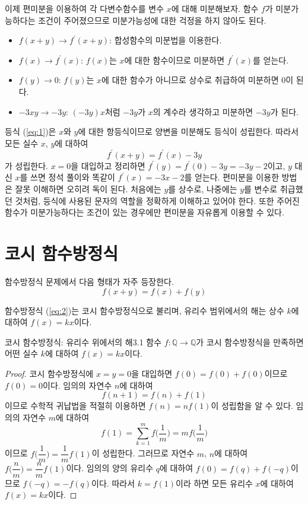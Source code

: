 \documentclass{article}
\begin{document}
이제 편미분을 이용하여 각 다변수함수를 변수 $x$에 대해 미분해보자. 함수 $f$가 미분가능하다는 조건이 주어졌으므로 미분가능성에 대한 걱정을 하지 않아도 된다.

\begin{itemize}
	\item $f(x+y)\to f^\prime(x+y)$: 합성함수의 미분법을 이용한다.
	\item $f(x)\to f^\prime(x)$: $f(x)$는 $x$에 대한 함수이므로 미분하면 $f^\prime(x)$를 얻는다.
	\item $f(y)\to 0$: $f(y)$는 $x$에 대한 함수가 아니므로 상수로 취급하여 미분하면 $0$이 된다.
	\item $-3xy\to -3y$: $(-3y)x$처럼 $-3y$가 $x$의 계수라 생각하고 미분하면 $-3y$가 된다.
\end{itemize}

등식 (\ref{eq:1})은 $x$와 $y$에 대한 항등식이므로 양변을 미분해도 등식이 성립한다. 따라서 모든 실수 $x$, $y$에 대하여
\[
	f^\prime(x+y)=f^\prime(x)-3y
\]
가 성립한다. $x=0$을 대입하고 정리하면 $f^\prime(y)=f^\prime(0)-3y=-3y-2$이고, $y$ 대신 $x$를 쓰면 정석 풀이와 똑같이 $f^\prime(x)=-3x-2$를 얻는다. 편미분을 이용한 방법은 잘못 이해하면 오히려 독이 된다. 처음에는 $y$를 상수로, 나중에는 $y$를 변수로 취급했던 것처럼, 등식에 사용된 문자의 역할을 정확하게 이해하고 있어야 한다. 또한 주어진 함수가 미분가능하다는 조건이 있는 경우에만 편미분을 자유롭게 이용할 수 있다.

\section{코시 함수방정식}
함수방정식 문제에서 다음 형태가 자주 등장한다.
\begin{equation}
	\label{eq:2}
	f(x+y)=f(x)+f(y)
\end{equation}

함수방정식 (\ref{eq:2})는 코시 함수방정식으로 불리며, 유리수 범위에서의 해는 상수 $k$에 대하여 $f(x)=kx$이다.

\begin{thm}{코시 함수방정식: 유리수 위에서의 해}{3.1}
	함수 $f:\mathbb Q\to\mathbb Q$가 코시 함수방정식을 만족하면 어떤 실수 $k$에 대하여 $f(x)=kx$이다.
\end{thm}

\begin{proof}
	코시 함수방정식에 $x=y=0$을 대입하면 $f(0)=f(0)+f(0)$이므로 $f(0)=0$이다. 임의의 자연수 $n$에 대하여
	\[
		f(n+1)=f(n)+f(1)
	\]
	이므로 수학적 귀납법을 적절히 이용하면 $f(n)=nf(1)$이 성립함을 알 수 있다. 임의의 자연수 $m$에 대하여
	\[
		f(1)=\sum_{k=1}^m f\biggl(\frac{1}{m}\biggr)=mf\biggl(\frac{1}{m}\biggr)
	\]
	이므로 $f\biggl(\dfrac{1}{m}\biggr)=\dfrac{1}{m}f(1)$이 성립한다. 그러므로 자연수 $m$, $n$에 대하여 $f\biggl(\dfrac{n}{m}\biggr)=\dfrac{n}{m}f(1)$이다. 임의의 양의 유리수 $q$에 대하여 $f(0)=f(q)+f(-q)$이므로 $f(-q)=-f(q)$이다. 따라서 $k=f(1)$이라 하면 모든 유리수 $x$에 대하여 $f(x)=kx$이다.
\end{proof}
\end{document}
